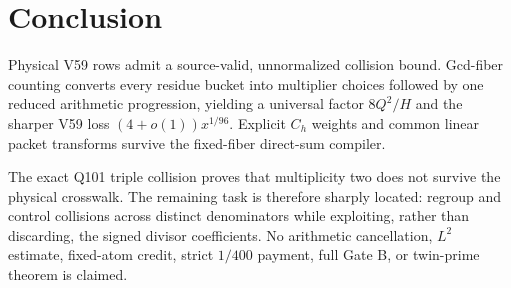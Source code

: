 \section{Conclusion}

Physical V59 rows admit a source-valid, unnormalized collision bound.  Gcd-fiber
counting converts every residue bucket into multiplier choices followed by one reduced
arithmetic progression, yielding a universal factor $8Q^2/H$ and the sharper V59 loss
$(4+o(1))x^{1/96}$.  Explicit $C_h$ weights and common linear packet transforms survive
the fixed-fiber direct-sum compiler.

The exact Q101 triple collision proves that multiplicity two does not survive the
physical crosswalk.  The remaining task is therefore sharply located: regroup and
control collisions across distinct denominators while exploiting, rather than
discarding, the signed divisor coefficients.  No arithmetic cancellation, $L^2$
estimate, fixed-atom credit, strict $1/400$ payment, full Gate B, or twin-prime theorem
is claimed.
